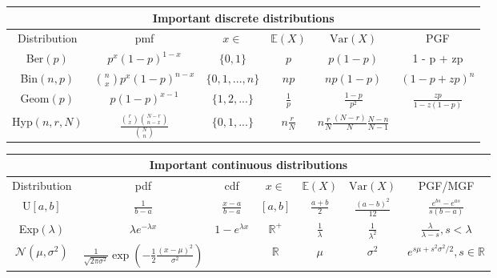 

\begin{tabular}{ |c|c|c|c|c|c|  }
    \hline
    \multicolumn{6}{|c|}{Important discrete distributions} \\
    \hline
    Distribution & pmf & \(x\in\) & \(\mathbb{E}(X)\)& \(\text{Var}(X)\) & PGF\\
    \hline
    Ber\((p)\)  & \(p^x(1-p)^{1-x}\) & \(\{0,1\}\) & \(p\) & \(p(1-p)\) & 1 - p + zp\\
    Bin\((n,p)\)  & \(\binom{n}{x} p^x(1-p)^{n-x}\) & \(\{0,1, ..., n\}\) & \(np\) & \(np(1-p)\) & \((1 - p + zp)^n\)\\
    Geom\((p)\) & \(p(1-p)^{x-1}\) & \(\{1,2, ...\}\) & \(\frac{1}{p}\)& \(\frac{1-p}{p^2}\) & \(\frac{zp}{1-z(1-p)}\)\\
    Hyp\((n,r,N)\) & \(\frac{\binom{r}{x}\binom{N-r}{n-x}}{\binom{N}{n}}\) & \(\{0,1,...\}\) & \(n\frac{r}{N}\)& \(n\frac{r}{N} \frac{(N-r)}{N} \frac{N-n}{N-1}\) & \\
    \hline
\end{tabular}

\begin{tabular}{ |c|c|c|c|c|c|c|  }
    \hline
    \multicolumn{7}{|c|}{Important continuous distributions} \\
    \hline
    Distribution & pdf & cdf & \(x\in\) & \(\mathbb{E}(X)\)& \(\text{Var}(X)\) & PGF/MGF\\
    \hline
    U\([a,b]\) & \(\frac{1}{b-a}\) & \(\frac{x-a}{b-a}\) & \([a,b]\) & \(\frac{a+b}{2}\) & \(\frac{\left(a-b\right)^2}{12}\) & \(\frac{e^{bs}-e^{as}}{s(b-a)}\)\\
    Exp\((\lambda)\) & \(\lambda e^{-\lambda x}\) & \(1 - e^{\lambda x}\)& \(\mathbb{R}^+\) & \(\frac{1}{\lambda}\)& \(\frac{1}{\lambda^2}\) & \(\frac{\lambda}{\lambda - s}, s<\lambda\)\\
    \(\mathcal{N}(\mu,\sigma^2)\) & \(\frac{1}{\sqrt{2\pi\sigma^2}}\exp\left(-\frac{1}{2}\frac{(x-\mu)^2}{\sigma^2}\right)\) & & \(\mathbb{R}\) & \(\mu\)& \(\sigma^2\) & \(e^{s\mu+s^2\sigma^2/2}, s\in\mathbb{R}\)\\
    \hline
\end{tabular}
   

